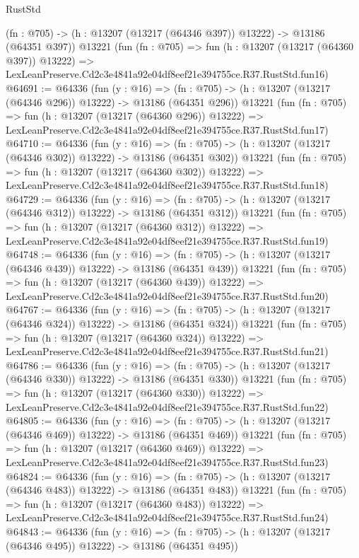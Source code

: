 \begin{lexlean}{RustStd}
\begin{coremodule}
    (fn : @705) -> (h : @13207 (@13217 (@64346 @397)) @13222) -> @13186 (@64351 @397))
    @13221
    (fun (fn : @705) =>
    fun (h : @13207 (@13217 (@64360 @397)) @13222) =>
    LexLeanPreserve.Cd2c3e4841a92e04df8eef21e394755ce.R37.RustStd.fun16)
@64691 := @64336
    (fun (y : @16) =>
    (fn : @705) -> (h : @13207 (@13217 (@64346 @296)) @13222) -> @13186 (@64351 @296))
    @13221
    (fun (fn : @705) =>
    fun (h : @13207 (@13217 (@64360 @296)) @13222) =>
    LexLeanPreserve.Cd2c3e4841a92e04df8eef21e394755ce.R37.RustStd.fun17)
@64710 := @64336
    (fun (y : @16) =>
    (fn : @705) -> (h : @13207 (@13217 (@64346 @302)) @13222) -> @13186 (@64351 @302))
    @13221
    (fun (fn : @705) =>
    fun (h : @13207 (@13217 (@64360 @302)) @13222) =>
    LexLeanPreserve.Cd2c3e4841a92e04df8eef21e394755ce.R37.RustStd.fun18)
@64729 := @64336
    (fun (y : @16) =>
    (fn : @705) -> (h : @13207 (@13217 (@64346 @312)) @13222) -> @13186 (@64351 @312))
    @13221
    (fun (fn : @705) =>
    fun (h : @13207 (@13217 (@64360 @312)) @13222) =>
    LexLeanPreserve.Cd2c3e4841a92e04df8eef21e394755ce.R37.RustStd.fun19)
@64748 := @64336
    (fun (y : @16) =>
    (fn : @705) -> (h : @13207 (@13217 (@64346 @439)) @13222) -> @13186 (@64351 @439))
    @13221
    (fun (fn : @705) =>
    fun (h : @13207 (@13217 (@64360 @439)) @13222) =>
    LexLeanPreserve.Cd2c3e4841a92e04df8eef21e394755ce.R37.RustStd.fun20)
@64767 := @64336
    (fun (y : @16) =>
    (fn : @705) -> (h : @13207 (@13217 (@64346 @324)) @13222) -> @13186 (@64351 @324))
    @13221
    (fun (fn : @705) =>
    fun (h : @13207 (@13217 (@64360 @324)) @13222) =>
    LexLeanPreserve.Cd2c3e4841a92e04df8eef21e394755ce.R37.RustStd.fun21)
@64786 := @64336
    (fun (y : @16) =>
    (fn : @705) -> (h : @13207 (@13217 (@64346 @330)) @13222) -> @13186 (@64351 @330))
    @13221
    (fun (fn : @705) =>
    fun (h : @13207 (@13217 (@64360 @330)) @13222) =>
    LexLeanPreserve.Cd2c3e4841a92e04df8eef21e394755ce.R37.RustStd.fun22)
@64805 := @64336
    (fun (y : @16) =>
    (fn : @705) -> (h : @13207 (@13217 (@64346 @469)) @13222) -> @13186 (@64351 @469))
    @13221
    (fun (fn : @705) =>
    fun (h : @13207 (@13217 (@64360 @469)) @13222) =>
    LexLeanPreserve.Cd2c3e4841a92e04df8eef21e394755ce.R37.RustStd.fun23)
@64824 := @64336
    (fun (y : @16) =>
    (fn : @705) -> (h : @13207 (@13217 (@64346 @483)) @13222) -> @13186 (@64351 @483))
    @13221
    (fun (fn : @705) =>
    fun (h : @13207 (@13217 (@64360 @483)) @13222) =>
    LexLeanPreserve.Cd2c3e4841a92e04df8eef21e394755ce.R37.RustStd.fun24)
@64843 := @64336
    (fun (y : @16) =>
    (fn : @705) -> (h : @13207 (@13217 (@64346 @495)) @13222) -> @13186 (@64351 @495))

\end{coremodule}
\end{lexlean}
